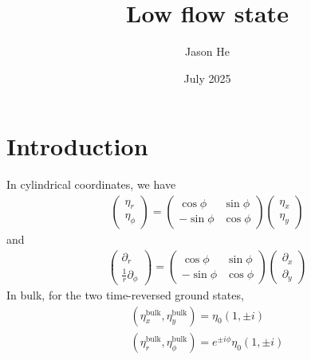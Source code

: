 \documentclass[aps,prl,preprint]{revtex4-2}
\begin{document}
\title{Low flow state}
\author{Jason He}
\date{July 2025}


\section{Introduction}
In cylindrical coordinates, we have
\begin{align}
    \begin{pmatrix}
        \eta_r \\ \eta_\phi
    \end{pmatrix}
    = \begin{pmatrix}
          \cos{\phi}  & \sin{\phi} \\
          -\sin{\phi} & \cos{\phi}
      \end{pmatrix}
    \begin{pmatrix}
        \eta_x \\ \eta_y
    \end{pmatrix}
\end{align}
and
\begin{align}
    \begin{pmatrix}
        \partial_r \\ \frac{1}{r}\partial_\phi
    \end{pmatrix}
    = \begin{pmatrix}
          \cos{\phi}  & \sin{\phi} \\
          -\sin{\phi} & \cos{\phi}
      \end{pmatrix}
    \begin{pmatrix}
        \partial_x \\ \partial_y
    \end{pmatrix}
\end{align}
In bulk, for the two time-reversed ground states,
\begin{align}
    (\eta^\text{bulk}_x, \eta^\text{bulk}_y) = \eta_0(1, \pm i) \\
    (\eta^\text{bulk}_r, \eta^\text{bulk}_\phi) = e^{\pm i\phi}\eta_0(1, \pm i)
\end{align}
\end{document}
